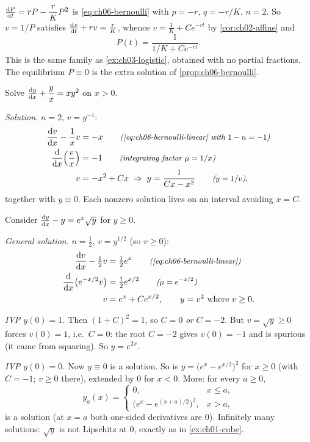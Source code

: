 \begin{example}\label{ex:ch06-logistic}
$\frac{\mathrm{d}P}{\mathrm{d}t} = rP - \dfrac{r}{K}P^2$ is \eqref{eq:ch06-bernoulli} with
$p = -r$, $q = -r/K$, $n = 2$. So $v = 1/P$ satisfies
$\frac{\mathrm{d}v}{\mathrm{d}t} + rv = \frac rK$, whence $v = \frac1K + Ce^{-rt}$ by
\cref{cor:ch02-affine} and
\[
  P(t) = \frac{1}{1/K + Ce^{-rt}} .
\]
This is the same family as \cref{ex:ch03-logistic}, obtained with no partial
fractions. The equilibrium $P\equiv0$ is the extra solution of
\cref{prop:ch06-bernoulli}.
\end{example}

\begin{example}[Bernoulli with $n = 2$]\label{ex:ch06-bern2}
Solve $\frac{\mathrm{d}y}{\mathrm{d}x} + \dfrac{y}{x} = xy^2$ on $x>0$.

\emph{Solution.} $n = 2$, $v = y^{-1}$:
\begin{align*}
  \frac{\mathrm{d}v}{\mathrm{d}x} - \frac1x v &= -x \qquad\text{\small\itshape(\eqref{eq:ch06-bernoulli-linear} with $1 - n = -1$)}\\
  \frac{\mathrm{d}}{\mathrm{d}x}\Bigl(\frac vx\Bigr) &= -1 \qquad\text{\small\itshape(integrating factor $\mu = 1/x$)}\\
  v &= -x^2 + Cx \;\Rightarrow\; y = \frac{1}{Cx - x^2}
     \qquad\text{\small\itshape($y = 1/v$)},
\end{align*}
together with $y\equiv0$. Each nonzero solution lives on an interval avoiding
$x = C$.
\end{example}

\begin{example}[Needs care: $n = \tfrac12$, spurious roots and non-uniqueness]\label{ex:ch06-bern-half}
Consider $\frac{\mathrm{d}y}{\mathrm{d}x} - y = e^x\sqrt{y}$ for $y\ge0$.

\emph{General solution.} $n = \frac12$, $v = y^{1/2}$ (so $v\ge0$):
\begin{align*}
  \frac{\mathrm{d}v}{\mathrm{d}x} - \tfrac12 v &= \tfrac12e^x \qquad\text{\small\itshape(\eqref{eq:ch06-bernoulli-linear})}\\
  \frac{\mathrm{d}}{\mathrm{d}x}\bigl(e^{-x/2}v\bigr) &= \tfrac12e^{x/2} \qquad\text{\small\itshape($\mu = e^{-x/2}$)}\\
  v &= e^x + Ce^{x/2},\qquad y = v^2\ \text{where } v\ge0 .
\end{align*}

\emph{IVP $y(0) = 1$.} Then $(1 + C)^2 = 1$, so $C = 0$ \emph{or} $C = -2$.
But $v = \sqrt y\ge 0$ forces $v(0) = 1$, i.e.\ $C = 0$: the root $C = -2$
gives $v(0) = -1$ and is spurious (it came from squaring). So $y = e^{2x}$.

\emph{IVP $y(0) = 0$.} Now $y\equiv0$ is a solution. So is
$y = \bigl(e^x - e^{x/2}\bigr)^2$ for $x\ge0$ (with $C = -1$; $v\ge0$ there),
extended by $0$ for $x<0$. More: for every $a\ge0$,
\[
  y_a(x) = \begin{cases} 0, & x\le a,\\ \bigl(e^x - e^{(x+a)/2}\bigr)^2, & x>a,\end{cases}
\]
is a solution (at $x = a$ both one-sided derivatives are $0$). Infinitely many
solutions: $\sqrt y$ is not Lipschitz at $0$, exactly as in
\cref{ex:ch01-cube}.
\end{example}

